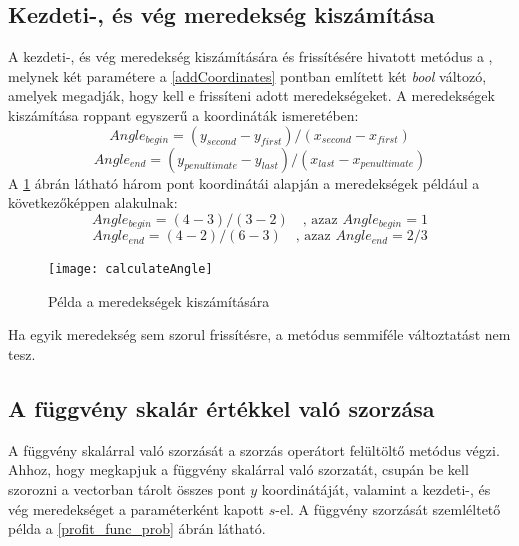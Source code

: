 \subsection{Kezdeti-, és vég meredekség kiszámítása} \label{calculateAngle}
A  kezdeti-, és vég meredekség kiszámítására és frissítésére hivatott metódus a , melynek két paramétere a \ref{addCoordinates} pontban említett két \textit{bool} változó, amelyek megadják, hogy kell e frissíteni adott meredekségeket.
A meredekségek kiszámítása roppant egyszerű a koordináták ismeretében:
$$Angle_{begin}=(y_{second}-y_{first}) / (x_{second}-x_{first})$$
$$Angle_{end}=(y_{penultimate}-y_{last}) / (x_{last}-x_{penultimate})$$
A \ref{calculate angle} ábrán látható három pont koordinátái alapján a meredekségek például a következőképpen alakulnak: 
$$Angle_{begin}=(4-3) / (3-2)\quad \text{, azaz } Angle_{begin}=1$$
$$Angle_{end}=(4-2) / (6-3)\quad \text{, azaz } Angle_{end}=2/3$$
\begin{figure}[H]
\begin{center}
\texttt{[image: calculateAngle]}
\caption{Példa a meredekségek kiszámítására}
\label{calculate angle}
\end{center}
\end{figure}
Ha egyik meredekség sem szorul frissítésre, a metódus semmiféle változtatást nem tesz.
\subsection{A függvény skalár értékkel való szorzása} \label{multiplyByScalar}
A függvény skalárral való szorzását a szorzás operátort felültöltő metódus végzi.
Ahhoz, hogy megkapjuk a függvény skalárral való szorzatát, csupán be kell szorozni a vectorban tárolt összes pont $y$ koordinátáját, valamint a kezdeti-, és vég meredekséget a paraméterként kapott $s$-el.
A függvény szorzását szemléltető példa a \ref{profit_func_prob} ábrán látható.
